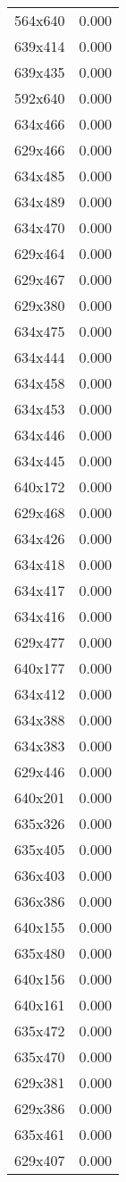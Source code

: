 \begin{table}
\begin{tabular}{lr}
564x640 & 0.000 \\
639x414 & 0.000 \\
639x435 & 0.000 \\
592x640 & 0.000 \\
634x466 & 0.000 \\
629x466 & 0.000 \\
634x485 & 0.000 \\
634x489 & 0.000 \\
634x470 & 0.000 \\
629x464 & 0.000 \\
629x467 & 0.000 \\
629x380 & 0.000 \\
634x475 & 0.000 \\
634x444 & 0.000 \\
634x458 & 0.000 \\
634x453 & 0.000 \\
634x446 & 0.000 \\
634x445 & 0.000 \\
640x172 & 0.000 \\
629x468 & 0.000 \\
634x426 & 0.000 \\
634x418 & 0.000 \\
634x417 & 0.000 \\
634x416 & 0.000 \\
629x477 & 0.000 \\
640x177 & 0.000 \\
634x412 & 0.000 \\
634x388 & 0.000 \\
634x383 & 0.000 \\
629x446 & 0.000 \\
640x201 & 0.000 \\
635x326 & 0.000 \\
635x405 & 0.000 \\
636x403 & 0.000 \\
636x386 & 0.000 \\
640x155 & 0.000 \\
635x480 & 0.000 \\
640x156 & 0.000 \\
640x161 & 0.000 \\
635x472 & 0.000 \\
635x470 & 0.000 \\
629x381 & 0.000 \\
629x386 & 0.000 \\
635x461 & 0.000 \\
629x407 & 0.000 \\

\end{tabular}
\end{table}
